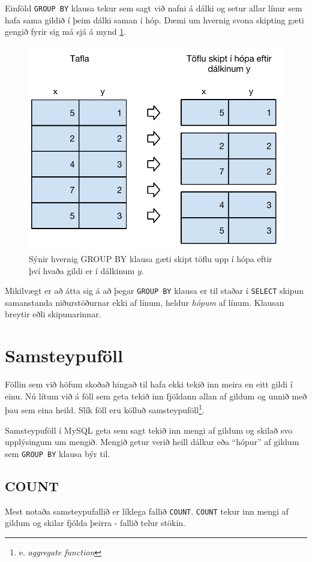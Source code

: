 Einföld \verb|GROUP BY| klausa tekur sem sagt við nafni á dálki og setur allar línur sem hafa sama gildið í þeim dálki saman í hóp. Dæmi um hvernig svona skipting gæti gengið fyrir sig má sjá á mynd \ref{mynd:group-by}.

\begin{figure}
\caption[GROUP BY]{Sýnir hvernig GROUP BY klausa gæti skipt töflu upp í hópa eftir því hvaða gildi er í dálkinum $y$.}
\label{mynd:group-by}
\centering
\includegraphics[width=\linewidth]{myndir/group-by}
\end{figure}

Mikilvægt er að átta sig á að þegar \verb|GROUP BY| klausa er til staðar í \verb|SELECT| skipun samanstanda niðurstöðurnar ekki af línum, heldur \emph{hópum} af línum. Klausan breytir eðli skipunarinnar. 

\section{Samsteypuföll}
Föllin sem við höfum skoðað hingað til hafa ekki tekið inn meira en eitt gildi í einu. Nú lítum við á föll sem geta tekið inn fjöldann allan af gildum og unnið með þau sem eina heild. Slík föll eru kölluð samsteypuföll\footnote{e. \emph{aggregate function}}.

Samsteypuföll í MySQL geta sem sagt tekið inn mengi af gildum og skilað svo upplýsingum um mengið. Mengið getur verið heill dálkur eða ``hópur'' af gildum sem \verb|GROUP BY| klausa býr til.

\subsection{COUNT}
Mest notaða samsteypufallið er líklega fallið \verb|COUNT|. \verb|COUNT| tekur inn mengi af gildum og skilar fjölda þeirra - fallið telur stökin.

